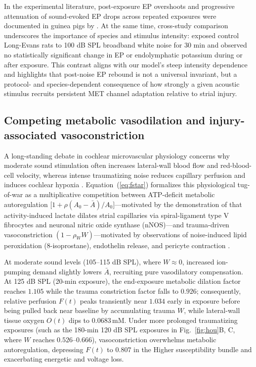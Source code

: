 \documentclass[final,5p,times]{elsarticle}
\begin{document}
In the experimental literature, post-exposure EP overshoots and progressive attenuation of sound-evoked EP drops across repeated exposures were documented in guinea pigs by \citet{SaltKonishi1979}. At the same time, cross-study comparison underscores the importance of species and stimulus intensity: \citet{Ma1995} exposed control Long-Evans rats to 100 dB SPL broadband white noise for 30 min and observed no statistically significant change in EP or endolymphatic potassium during or after exposure. This contrast aligns with our model's steep intensity dependence and highlights that post-noise EP rebound is not a universal invariant, but a protocol- and species-dependent consequence of how strongly a given acoustic stimulus recruits persistent MET channel adaptation relative to strial injury.

\subsection{Competing metabolic vasodilation and injury-associated vasoconstriction}\label{sec:alignment-vascular}

A long-standing debate in cochlear microvascular physiology concerns why moderate sound stimulation often increases lateral-wall blood flow and red-blood-cell velocity, whereas intense traumatizing noise reduces capillary perfusion and induces cochlear hypoxia \citep{Nuttall1999,Dai2011,Shi2016}. Equation~(\ref{eq:fstar}) formalizes this physiological tug-of-war as a multiplicative competition between ATP-deficit metabolic autoregulation \(\bigl[1 + \rho(A_0 - \bar{A})/A_0\bigr]\)---motivated by the demonstration of \citet{Dai2011} that activity-induced lactate dilates strial capillaries via spiral-ligament type V fibrocytes and neuronal nitric oxide synthase (nNOS)---and trauma-driven vasoconstriction \((1 - \rho_W W)\)---motivated by observations of noise-induced lipid peroxidation (8-isoprostane), endothelin release, and pericyte contraction \citep{Nuttall1999,Hou2020}.

At moderate sound levels (105--115 dB SPL), where \(W \approx 0\), increased ion-pumping demand slightly lowers \(\bar{A}\), recruiting pure vasodilatory compensation. At 125 dB SPL (20-min exposure), the end-exposure metabolic dilation factor reaches \(1.105\) while the trauma constriction factor falls to \(0.926\); consequently, relative perfusion \(F(t)\) peaks transiently near \(1.034\) early in exposure before being pulled back near baseline by accumulating trauma \(W\), while lateral-wall tissue oxygen \(O(t)\) dips to \(0.0683\,\mathrm{mM}\). Under more prolonged traumatizing exposures (such as the 180-min 120 dB SPL exposures in Fig.~\ref{fig:hou}B, C, where \(W\) reaches \(0.526\text{--}0.666\)), vasoconstriction overwhelms metabolic autoregulation, depressing \(F(t)\) to \(0.807\) in the Higher susceptibility bundle and exacerbating energetic and voltage loss.
\end{document}
